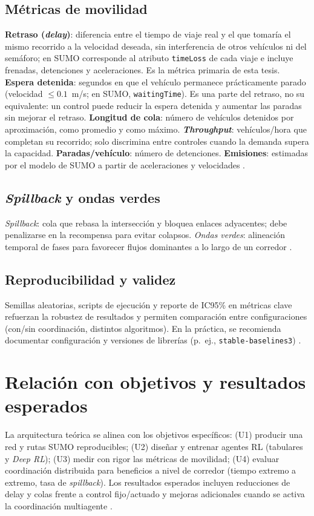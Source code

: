 \subsection*{Métricas de movilidad}
\textbf{Retraso (\textit{delay})}: diferencia entre el tiempo de viaje real y el que tomaría el mismo recorrido a la velocidad deseada, sin interferencia de otros vehículos ni del semáforo; en SUMO corresponde al atributo \texttt{timeLoss} de cada viaje e incluye frenadas, detenciones y aceleraciones. Es la métrica primaria de esta tesis. \textbf{Espera detenida}: segundos en que el vehículo permanece prácticamente parado (velocidad $\leq 0.1$~m/s; en SUMO, \texttt{waitingTime}). Es una parte del retraso, no su equivalente: un control puede reducir la espera detenida y aumentar las paradas sin mejorar el retraso. \textbf{Longitud de cola}: número de vehículos detenidos por aproximación, como promedio y como máximo. \textbf{\textit{Throughput}}: vehículos/hora que completan su recorrido; solo discrimina entre controles cuando la demanda supera la capacidad. \textbf{Paradas/vehículo}: número de detenciones. \textbf{Emisiones}: estimadas por el modelo de SUMO a partir de aceleraciones y velocidades \citep{FHWA_Timing_Manual_Chapter3,FHWA_Toolbox_Definitions,SUMO_Emissions,HCM2000_or_2010}.

\subsection*{\textit{Spillback} y ondas verdes}
\textit{Spillback}: cola que rebasa la intersección y bloquea enlaces adyacentes; debe penalizarse en la recompensa para evitar colapsos. \textit{Ondas verdes}: alineación temporal de fases para favorecer flujos dominantes a lo largo de un corredor \citep{FHWA_Timing_Manual_Chapter3,HCM2000_or_2010}.

\subsection*{Reproducibilidad y validez}
Semillas aleatorias, scripts de ejecución y reporte de IC95\% en métricas clave refuerzan la robustez de resultados y permiten comparación entre configuraciones (con/sin coordinación, distintos algoritmos). En la práctica, se recomienda documentar configuración y versiones de librerías (p.~ej., \texttt{stable-baselines3}) \citep{SB3_Docs}.

\section{Relación con objetivos y resultados esperados}

La arquitectura teórica se alinea con los objetivos específicos: (U1) producir una red y rutas SUMO reproducibles; (U2) diseñar y entrenar agentes RL (tabulares y \textit{Deep RL}); (U3) medir con rigor las métricas de movilidad; (U4) evaluar coordinación distribuida para beneficios a nivel de corredor (tiempo extremo a extremo, tasa de \textit{spillback}). Los resultados esperados incluyen reducciones de delay y colas frente a control fijo/actuado y mejoras adicionales cuando se activa la coordinación multiagente \citep{FHWA_Timing_Manual_Chapter3,HCM2000_or_2010,Yu2021_MAPPO}.
